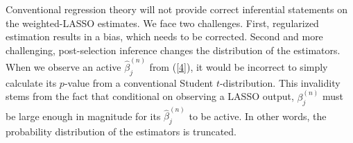 \documentclass[11pt]{article}
\def\cmt#1{{\textcolor{red}{(#1)}}}
\begin{document}
	
	Conventional regression theory will not provide correct inferential statements on the weighted-LASSO estimates. We face two challenges. First, regularized estimation results in a bias, which needs to be corrected. Second and more challenging, post-selection inference changes the distribution of the estimators. When we observe an active $\hat{\beta}^{(n)}_j$ from (\ref{4}), it would be incorrect to simply calculate its $p$-value from a conventional Student $t$-distribution. This invalidity stems from the fact that conditional on observing a LASSO output, ${\beta}^{(n)}_j$ must be large enough in magnitude for its $\hat{\beta}^{(n)}_j$ to be active. In other words, the probability distribution of the estimators is truncated. 
	
	
\end{document}
